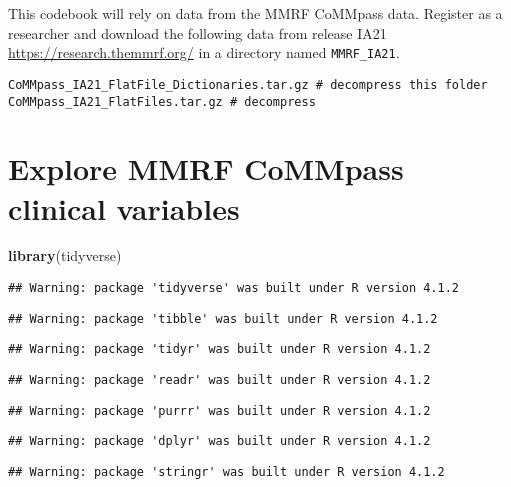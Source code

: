 \documentclass[
]{book}
\newenvironment{Shaded}{\begin{snugshade}}{\end{snugshade}}
\newcommand{\FunctionTok}[1]{\textcolor[rgb]{0.13,0.29,0.53}{\textbf{#1}}}
\newcommand{\NormalTok}[1]{#1}
\begin{document}
This codebook will rely on data from the MMRF CoMMpass data. Register as a researcher and download the following data from release IA21 \href{https://research.themmrf.org/population/\#/ds/6262ea84d1211200016ce44c/downloads}{https://research.themmrf.org/} in a directory named \texttt{MMRF\_IA21}.

\begin{verbatim}
CoMMpass_IA21_FlatFile_Dictionaries.tar.gz # decompress this folder
CoMMpass_IA21_FlatFiles.tar.gz # decompress
\end{verbatim}

\hypertarget{explore-mmrf-commpass-clinical-variables}{%
\section{Explore MMRF CoMMpass clinical variables}\label{explore-mmrf-commpass-clinical-variables}}

\begin{Shaded}
\begin{Highlighting}[]
\FunctionTok{library}\NormalTok{(tidyverse)}
\end{Highlighting}
\end{Shaded}

\begin{verbatim}
## Warning: package 'tidyverse' was built under R version 4.1.2
\end{verbatim}

\begin{verbatim}
## Warning: package 'tibble' was built under R version 4.1.2
\end{verbatim}

\begin{verbatim}
## Warning: package 'tidyr' was built under R version 4.1.2
\end{verbatim}

\begin{verbatim}
## Warning: package 'readr' was built under R version 4.1.2
\end{verbatim}

\begin{verbatim}
## Warning: package 'purrr' was built under R version 4.1.2
\end{verbatim}

\begin{verbatim}
## Warning: package 'dplyr' was built under R version 4.1.2
\end{verbatim}

\begin{verbatim}
## Warning: package 'stringr' was built under R version 4.1.2
\end{verbatim}
\end{document}
